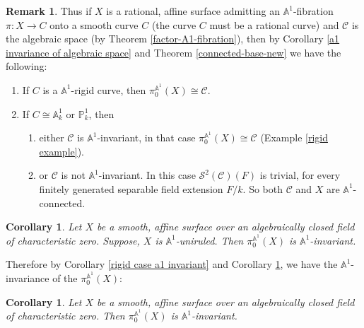 \documentclass[11pt, reqno]{amsart}
\theoremstyle{plain}
\newtheorem{corollary}[thm]{Corollary}
\theoremstyle{definition}
\newtheorem{remark}[thm]{Remark}
\newcommand{\sC}{{\mathcal C}}
\newcommand{\sS}{{\mathcal S}}
\newcommand{\A}{{\mathbb A}}
\renewcommand{\P}{{\mathbb P}}
\begin{document}
 	\begin{remark}
 	    Thus if $X$ is a rational, affine surface admitting an $\A^1$-fibration $\pi: X \to C$ 
        onto a smooth curve $C$ (the curve $C$ must be a rational curve) and $\sC$ is the algebraic space (by Theorem \ref{factor-A1-fibration}), then by Corollary \ref{a1 invariance of algebraic space} and Theorem \ref{connected-base-new} we have the following:
        \begin{enumerate}
            \item If $C$ is a $\A^1$-rigid curve, then $\pi_0^{\A^1}(X) \cong \sC$.
            \item If $C \cong \A^1_k \text{ or } \P^1_k$, then 
            \begin{enumerate}
                \item either $\sC$ is $\A^1$-invariant, in that case $\pi_0^{\A^1}(X) \cong \sC$ (Example \ref{rigid example}).
                \item or $\sC$ is not $\A^1$-invariant. In this case $\sS^2(\sC)(F)$ is trivial, for every finitely generated separable field extension $F/k$. So both $\sC$ and $X$ are $\A^1$-connected.
            \end{enumerate}
        \end{enumerate}
 	\end{remark}
\begin{corollary} \label{negative kodaira invariant}
Let $X$ be a smooth, affine surface over an algebraically closed field of characteristic zero. Suppose, $X$ is $\A^1$-uniruled. Then $\pi_0^{\A^1}(X)$ is $\A^1$-invariant.
\end{corollary}
Therefore by Corollary \ref{rigid case a1 invariant} and Corollary \ref{negative kodaira invariant}, we have the $\A^1$-invariance of the $\pi_0^{\A^1}(X)$:
\begin{corollary}\label{main corollary}
Let $X$ be a smooth, affine surface over an algebraically closed field of characteristic zero. 
Then $\pi_0^{\A^1}(X)$ is $\A^1$-invariant.
\end{corollary}
\end{document}
